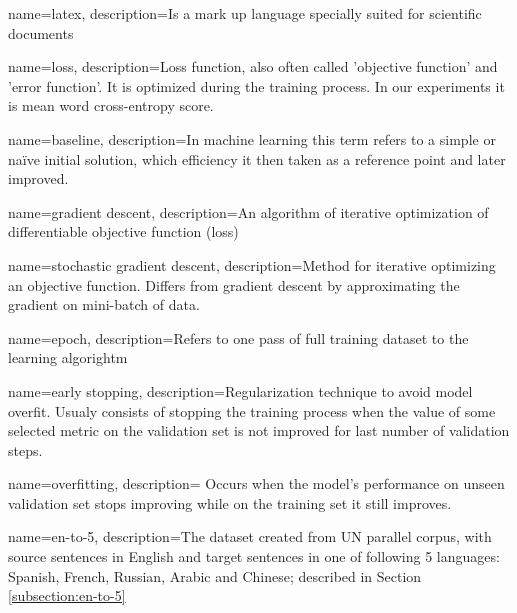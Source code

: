 

\makeglossaries

{
    name=latex,
    description={Is a mark up language specially suited 
    for scientific documents}
}

{
    name=loss,
    description={Loss function, also often called 'objective function' and
		 'error function'. It is optimized during the training
		 process. In our experiments it is mean word cross-entropy score.}
}

{
    name=baseline,
    description={In machine learning this term refers to a simple or
		 naïve initial solution, which efficiency it then
		 taken as a reference point and later improved.
		}
}

{
    name=gradient descent,
    description={An algorithm of iterative optimization of 
		 differentiable objective function (loss)}
}

{
    name=stochastic gradient descent,
    description={Method for iterative optimizing an objective function.
		 Differs from gradient descent by approximating the gradient
		 on mini-batch of data.}
}

{
    name=epoch,
    description={Refers to one pass of full training dataset to the learning 
		 algorightm
		}
}

{
    name=early stopping,
    description={Regularization technique to avoid model overfit.
		 Usualy consists of stopping the training process
		 when the value of some selected metric on the 
		 validation set is not improved for last number of
		 validation steps.
		}
}

{
    name=overfitting,
    description={
		 Occurs when the model's performance on unseen validation
		 set stops improving while on the training set
		 it still improves.
		}
}

{
    name=en-to-5,
    description={The dataset created from UN parallel corpus,
	with source sentences in English and target sentences
	in one of following 5 languages: Spanish, French, Russian,
	Arabic and Chinese; described in Section \ref{subsection:en-to-5}
	}
}

